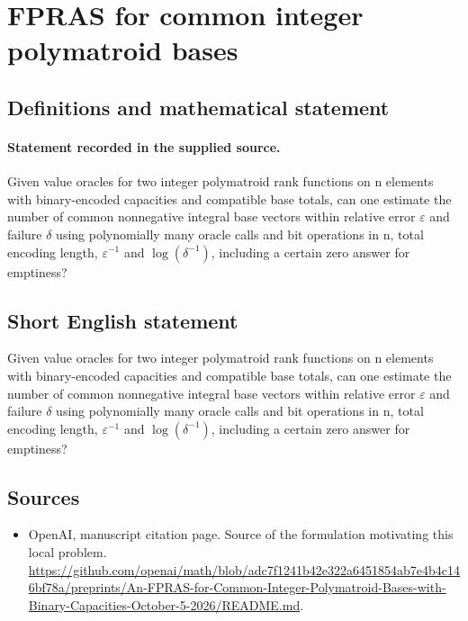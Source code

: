 \documentclass[11pt]{article}
\begin{document}
\section*{FPRAS for common integer polymatroid bases}\label{30007446}
\subsection{Definitions and mathematical statement}
\paragraph{Statement recorded in the supplied source.}
Given value oracles for two integer polymatroid rank functions on n elements with binary-encoded capacities and compatible base totals, can one estimate the number of common nonnegative integral base vectors within relative error $\varepsilon $ and failure $\delta $ using polynomially many oracle calls and bit operations in n, total encoding length, $\varepsilon ^{-1}$ and $\log (\delta ^{-1})$, including a certain zero answer for emptiness?
\subsection{Short English statement}
Given value oracles for two integer polymatroid rank functions on n elements with binary-encoded capacities and compatible base totals, can one estimate the number of common nonnegative integral base vectors within relative error $\varepsilon $ and failure $\delta $ using polynomially many oracle calls and bit operations in n, total encoding length, $\varepsilon ^{-1}$ and $\log (\delta ^{-1})$, including a certain zero answer for emptiness?
\subsection{Sources}
\begin{itemize}
\item[S1] OpenAI, manuscript citation page. Source of the formulation motivating this local problem.
\url{https://github.com/openai/math/blob/adc7f1241b42e322a6451854ab7e4b4c146bf78a/preprints/An-FPRAS-for-Common-Integer-Polymatroid-Bases-with-Binary-Capacities-October-5-2026/README.md}.
\end{itemize}
\end{document}
